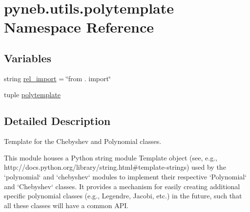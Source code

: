 \hypertarget{namespacepyneb_1_1utils_1_1polytemplate}{\section{pyneb.\-utils.\-polytemplate Namespace Reference}
\label{namespacepyneb_1_1utils_1_1polytemplate}
}
\subsection*{Variables}
\begin{DoxyCompactItemize}
\item 
string \hyperlink{namespacepyneb_1_1utils_1_1polytemplate_aa83c10e04dfe538e76bb3ef660edeff9}{rel\-\_\-import} = \char`\"{}from . import\char`\"{}
\item 
tuple \hyperlink{namespacepyneb_1_1utils_1_1polytemplate_a7ee2416855723d9fcee3328ec01ad826}{polytemplate}
\end{DoxyCompactItemize}


\subsection{Detailed Description}
\begin{DoxyVerb}Template for the Chebyshev and Polynomial classes.

This module houses a Python string module Template object (see, e.g.,
http://docs.python.org/library/string.html#template-strings) used by
the `polynomial` and `chebyshev` modules to implement their respective
`Polynomial` and `Chebyshev` classes.  It provides a mechanism for easily
creating additional specific polynomial classes (e.g., Legendre, Jacobi,
etc.) in the future, such that all these classes will have a common API.\end{DoxyVerb}
 


